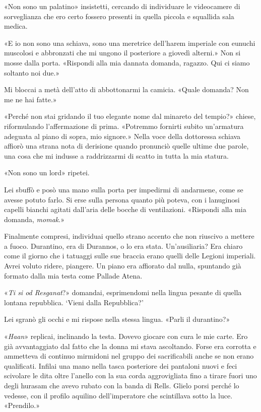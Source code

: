 «Non sono un palatino» insistetti, cercando di individuare le
videocamere di sorveglianza che ero certo fossero presenti in quella
piccola e squallida sala medica.

«E io non sono una schiava, sono una meretrice dell'harem imperiale con
eunuchi muscolosi e abbronzati che mi ungono il posteriore a giovedì
alterni.» Non si mosse dalla porta. «Rispondi alla mia dannata domanda,
ragazzo. Qui ci siamo soltanto noi due.»

Mi bloccai a metà dell'atto di abbottonarmi la camicia. «Quale domanda?
Non me ne hai fatte.»

«Perché non stai gridando il tuo elegante nome dal minareto del tempio?»
chiese, riformulando l'affermazione di prima. «{Potremmo} fornirti
subito un'armatura adeguata al piano di sopra, mio signore.» Nella voce
della dottoressa schiava affiorò una strana nota di derisione quando
pronunciò quelle ultime due parole, una cosa che mi indusse a
raddrizzarmi di scatto in tutta la mia statura.

«Non sono un lord» ripetei.

Lei sbuffò e posò una mano sulla porta per impedirmi di andarmene, come
se avesse potuto farlo. Si erse sulla persona quanto più poteva, con i
lanuginosi capelli bianchi agitati dall'aria delle bocche di
ventilazioni. «Rispondi alla mia domanda, \emph{momak}.»

Finalmente compresi, individuai quello strano accento che non riuscivo a
mettere a fuoco. Durantino, era di Durannos, o lo era stata.
Un'ausiliaria? Era chiaro come il giorno che i tatuaggi sulle sue
braccia erano quelli delle Legioni imperiali. Avrei voluto ridere,
piangere. Un piano era affiorato dal nulla, spuntando già formato dalla
mia testa come Pallade Atena.

«\emph{Ti si od Resganat}?» domandai, esprimendomi nella lingua pesante
di quella lontana repubblica. `Vieni dalla Repubblica?'

Lei sgranò gli occhi e mi rispose nella stessa lingua. «Parli il
durantino?»

«\emph{Haan}» replicai, inclinando la testa. Dovevo giocare con cura le
mie carte. Ero già avvantaggiato dal fatto che la donna mi stava
ascoltando. Forse era corrotta e ammetteva di continuo mirmidoni nel
gruppo dei sacrificabili anche se non erano qualificati. Infilai una
mano nella tasca posteriore dei pantaloni nuovi e feci scivolare le dita
oltre l'anello con la sua corda aggrovigliata fino a tirare fuori uno
degli hurasam che avevo rubato con la banda di Rells. Glielo porsi
perché lo vedesse, con il profilo aquilino dell'imperatore che
scintillava sotto la luce. «Prendilo.»

